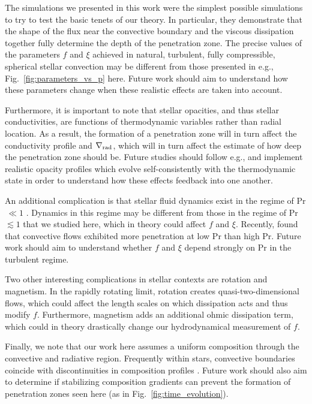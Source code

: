 \documentclass[twocolumn]{aastex631}
\newcommand{\gradrad}{\ensuremath{\nabla_{\rm{rad}}}}
\newcommand\Pran{\ensuremath{\mathrm{Pr}}}
\begin{document}
The simulations we presented in this work were the simplest possible simulations to try to test the basic tenets of our theory.
In particular, they demonstrate that the shape of the flux near the convective boundary and the viscous dissipation together fully determine the depth of the penetration zone.
The precise values of the parameters $f$ and $\xi$ achieved in natural, turbulent, fully compressible, spherical stellar convection may be different from those presented in e.g., Fig.~\ref{fig:parameters_vs_p} here.
Future work should aim to understand how these parameters change when these realistic effects are taken into account.

Furthermore, it is important to note that stellar opacities, and thus stellar conductivities, are functions of thermodynamic variables rather than radial location.
As a result, the formation of a penetration zone will in turn affect the conductivity profile and $\gradrad$, which will in turn affect the estimate of how deep the penetration zone should be.
Future studies should follow e.g., \citet{kapyla_etal_2017} and implement realistic opacity profiles which evolve self-consistently with the thermodynamic state in order to understand how these effects feedback into one another.

An additional complication is that stellar fluid dynamics exist in the regime of Pr$\,\ll1$ \citep{garaud2021}.
Dynamics in this regime may be different from those in the regime of Pr $\lesssim 1$ that we studied here, which in theory could affect $f$ and $\xi$.
Recently, \citet{kapyla2021} found that convective flows exhibited more penetration at low Pr than high Pr.
Future work should aim to understand whether $f$ and $\xi$ depend strongly on $\Pran$ in the turbulent regime.

Two other interesting complications in stellar contexts are rotation and magnetism.
In the rapidly rotating limit, rotation creates quasi-two-dimensional flows, which could affect the length scales on which dissipation acts and thus modify $f$.
Furthermore, magnetism adds an additional ohmic dissipation term, which could in theory drastically change our hydrodynamical measurement of $f$.

Finally, we note that our work here assumes a uniform composition through the convective and radiative region.
Frequently within stars, convective boundaries coincide with discontinuities in composition profiles \citep{salaris_cassisi_2017}.
Future work should also aim to determine if stabilizing composition gradients can prevent the formation of penetration zones seen here (as in Fig.~\ref{fig:time_evolution}).
\end{document}
